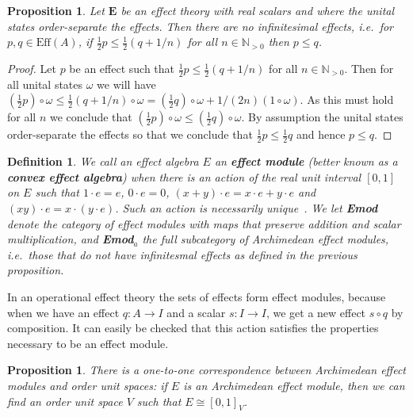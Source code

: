 \documentclass[b5paper,onecolumn,12pt,accepted=2019-05-03, issue=1, volume=1, shorttitle=papers/compositionality-1-1]{compositionalityarticle}
\newcounter{counter}
\numberwithin{counter}{section}
\newtheorem{proposition}[counter]{Proposition}
\newtheorem{definition}[counter]{Definition}
\newcommand{\N}{\mathbb{N}}
\newcommand{\pred}{\text{Eff}}
\begin{document}
\begin{proposition}
    Let $\mathbf{E}$ be an effect theory with real scalars and where the unital states order-separate the effects. Then there are no infinitesimal effects, i.e.~for $p,q\in\pred(A)$, if $\frac{1}{2}p\leq \frac{1}{2}(q+1/n)$ for all $n\in\N_{>0}$ then $p\leq q$.
\end{proposition}
\begin{proof}
    Let $p$ be an effect such that $\frac{1}{2}p\leq \frac{1}{2}(q+1/n)$ for all $n\in \N_{>0}$. Then for all unital states $\omega$ we will have $(\frac{1}{2}p)\circ \omega\leq \frac{1}{2}(q+1/n)\circ \omega = (\frac{1}{2}q)\circ\omega + 1/(2n)(1\circ \omega)$. 
    As this must hold for all $n$ we conclude that $(\frac{1}{2}p)\circ \omega\leq (\frac{1}{2}q)\circ \omega$. 
    By assumption the unital states order-separate the effects so that we conclude that $\frac{1}{2}p\leq \frac{1}{2}q$ and hence $p\leq q$.
\end{proof}


\begin{definition}
    We call an effect algebra $E$ an \textbf{effect module} (better known as a \textbf{convex effect algebra}) when there is an action of the real unit interval $[0,1]$ on $E$ such that $1\cdot e = e$, $0\cdot e = 0$, $(x+y)\cdot e = x\cdot e + y\cdot e$ and $(xy)\cdot e = x\cdot (y\cdot e)$. Such an action is necessarily unique~\cite{gudder1999convex}. We let \textbf{Emod} denote the category of effect modules with maps that preserve addition and scalar multiplication, and \textbf{Emod}$_a$ the full subcategory of \emph{Archimedean} effect modules, i.e.~those that do not have infinitesmal effects as defined in the previous proposition.
\end{definition}

In an operational effect theory the sets of effects form effect modules, because when we have an effect $q:A\rightarrow I$ and a scalar $s: I\rightarrow I$, we get a new effect $s\circ q$ by composition. It can easily be checked that this action satisfies the properties necessary to be an effect module.

\begin{proposition}
\cite{gudder1999convex,jacobs2016expectation} There is a one-to-one correspondence between Archimedean effect modules and order unit spaces: if $E$ is an Archimedean effect module, then we can find an order unit space $V$ such that $E\cong [0,1]_V$.
\end{proposition}
\end{document}
